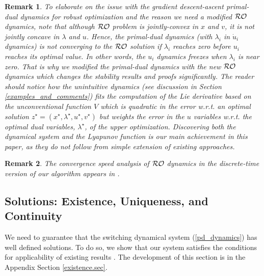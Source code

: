 \documentclass[journal,twoside,web]{ieeecolor}
\newtheorem{remark}{Remark}
\begin{document}
\begin{remark} \label{remark_reader_notice}
To elaborate on the issue with the gradient descent-ascent primal-dual dynamics for robust optimization and the reason we need a modified ${\cal RO}$ dynamics, note that although ${\cal RO}$ problem is jointly-convex in $x$ and $v$, it is not jointly concave in $\lambda$ and $u$. Hence, the primal-dual dynamics (with $\lambda_i$ in $\dot u_i$ dynamics) is not converging to the ${\cal RO}$ solution if $\lambda_i$ reaches zero before $u_i$ reaches its optimal value. In other words, the $u_i$ dynamics freezes when $\lambda_i$ is near zero. That is why we modified the primal-dual dynamics with the new ${\cal RO}$ dynamics which changes the stability results and proofs significantly. 
The reader should notice how the unintuitive dynamics (see discussion in Section \ref{examples_and_comments}) fits the computation of the Lie derivative based on the unconventional function $V$ which is quadratic in the error w.r.t. an optimal solution $z^\star=(x^\star,\lambda^\star,u^\star,v^\star)$ but weights the error in the $u$ variables w.r.t. the optimal dual variables, $\lambda^\star$, of the upper optimization. Discovering both the dynamical system and the Lyapunov function is our main achievement in this paper, as they do not follow from simple extension of existing approaches.
\end{remark}

\begin{remark} \label{convergence_speed}
The convergence speed analysis of ${\cal RO}$ dynamics in the discrete-time version of our algorithm appears in \cite{ebrahimi2019cdc}.
\end{remark}

\subsection{Solutions: Existence, Uniqueness, and Continuity}
We need to guarantee that the switching dynamical system (\ref{pd_dynamics}) has well defined solutions. 
To do so, we show that our system satisfies the conditions for applicability of existing results \cite{cherukuri2016}. The development of this section is in the Appendix Section \ref{existence.sec}. 

\end{document}
